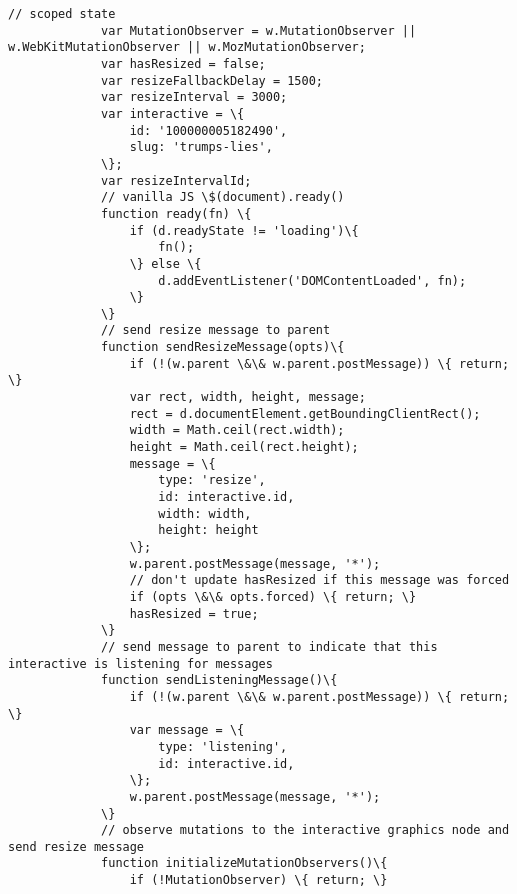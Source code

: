 \documentclass[11pt]{article}
\begin{document}
\begin{Verbatim}[commandchars=\\\{\}]
             // scoped state
             var MutationObserver = w.MutationObserver || w.WebKitMutationObserver || w.MozMutationObserver;
             var hasResized = false;
             var resizeFallbackDelay = 1500;
             var resizeInterval = 3000;
             var interactive = \{
                 id: '100000005182490',
                 slug: 'trumps-lies',
             \};
             var resizeIntervalId;
             // vanilla JS \$(document).ready()
             function ready(fn) \{
                 if (d.readyState != 'loading')\{
                     fn();
                 \} else \{
                     d.addEventListener('DOMContentLoaded', fn);
                 \}
             \}
             // send resize message to parent
             function sendResizeMessage(opts)\{
                 if (!(w.parent \&\& w.parent.postMessage)) \{ return; \}
                 var rect, width, height, message;
                 rect = d.documentElement.getBoundingClientRect();
                 width = Math.ceil(rect.width);
                 height = Math.ceil(rect.height);
                 message = \{
                     type: 'resize',
                     id: interactive.id,
                     width: width,
                     height: height
                 \};
                 w.parent.postMessage(message, '*');
                 // don't update hasResized if this message was forced
                 if (opts \&\& opts.forced) \{ return; \}
                 hasResized = true;
             \}
             // send message to parent to indicate that this interactive is listening for messages
             function sendListeningMessage()\{
                 if (!(w.parent \&\& w.parent.postMessage)) \{ return; \}
                 var message = \{
                     type: 'listening',
                     id: interactive.id,
                 \};
                 w.parent.postMessage(message, '*');
             \}
             // observe mutations to the interactive graphics node and send resize message
             function initializeMutationObservers()\{
                 if (!MutationObserver) \{ return; \}
         

\end{Verbatim}
\end{document}
